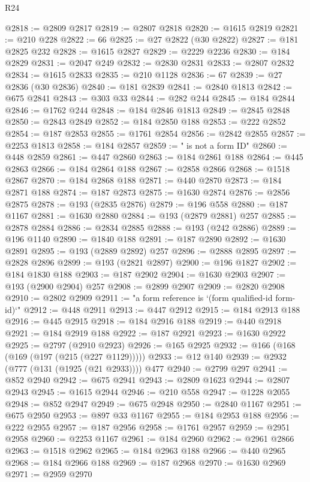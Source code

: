 \begin{lexlean}{R24}
\begin{coremodule}
@2818 := @2809 @2817
@2819 := @2807 @2818
@2820 := @1615 @2819
@2821 := @210 @228
@2822 := 66
@2825 := @27 @2822 (@30 @2822)
@2827 := @181 @2825 @232
@2828 := @1615 @2827
@2829 := @2229 @2236
@2830 := @184 @2829
@2831 := @2047 @249
@2832 := @2830 @2831
@2833 := @2807 @2832
@2834 := @1615 @2833
@2835 := @210 @1128
@2836 := 67
@2839 := @27 @2836 (@30 @2836)
@2840 := @181 @2839
@2841 := @2840 @1813
@2842 := @675 @2841
@2843 := @303 @33
@2844 := @282 @244
@2845 := @184 @2844
@2846 := @1762 @244
@2848 := @184 @2846 @1813
@2849 := @2845 @2848
@2850 := @2843 @2849
@2852 := @184 @2850 @188
@2853 := @222 @2852
@2854 := @187 @2853
@2855 := @1761 @2854
@2856 := @2842 @2855
@2857 := @2253 @1813
@2858 := @184 @2857
@2859 := " is not a form ID"
@2860 := @448 @2859
@2861 := @447 @2860
@2863 := @184 @2861 @188
@2864 := @445 @2863
@2866 := @184 @2864 @188
@2867 := @2858 @2866
@2868 := @1518 @2867
@2870 := @184 @2868 @188
@2871 := @440 @2870
@2873 := @184 @2871 @188
@2874 := @187 @2873
@2875 := @1630 @2874
@2876 := @2856 @2875
@2878 := @193 (@2835 @2876)
@2879 := @196 @558
@2880 := @187 @1167
@2881 := @1630 @2880
@2884 := @193 (@2879 @2881) @257
@2885 := @2878 @2884
@2886 := @2834 @2885
@2888 := @193 (@242 @2886)
@2889 := @196 @1140
@2890 := @1840 @188
@2891 := @187 @2890
@2892 := @1630 @2891
@2895 := @193 (@2889 @2892) @257
@2896 := @2888 @2895
@2897 := @2828 @2896
@2899 := @193 (@2821 @2897)
@2900 := @196 @1827
@2902 := @184 @1830 @188
@2903 := @187 @2902
@2904 := @1630 @2903
@2907 := @193 (@2900 @2904) @257
@2908 := @2899 @2907
@2909 := @2820 @2908
@2910 := @2802 @2909
@2911 := "a form reference is `(form qualified-id form-id)`"
@2912 := @448 @2911
@2913 := @447 @2912
@2915 := @184 @2913 @188
@2916 := @445 @2915
@2918 := @184 @2916 @188
@2919 := @440 @2918
@2921 := @184 @2919 @188
@2922 := @187 @2921
@2923 := @1630 @2922
@2925 := @2797 (@2910 @2923)
@2926 := @165 @2925
@2932 := @166 (@168 (@169 (@197 (@215 (@227 @1129)))))
@2933 := @12 @140
@2939 := @2932 (@777 (@131 (@1925 (@21 @2933)))) @477
@2940 := @2799 @297
@2941 := @852 @2940
@2942 := @675 @2941
@2943 := @2809 @1623
@2944 := @2807 @2943
@2945 := @1615 @2944
@2946 := @210 @558
@2947 := @1228 @2055
@2948 := @852 @2947
@2949 := @675 @2948
@2950 := @2840 @1167
@2951 := @675 @2950
@2953 := @897 @33 @1167
@2955 := @184 @2953 @188
@2956 := @222 @2955
@2957 := @187 @2956
@2958 := @1761 @2957
@2959 := @2951 @2958
@2960 := @2253 @1167
@2961 := @184 @2960
@2962 := @2961 @2866
@2963 := @1518 @2962
@2965 := @184 @2963 @188
@2966 := @440 @2965
@2968 := @184 @2966 @188
@2969 := @187 @2968
@2970 := @1630 @2969
@2971 := @2959 @2970

\end{coremodule}
\end{lexlean}
